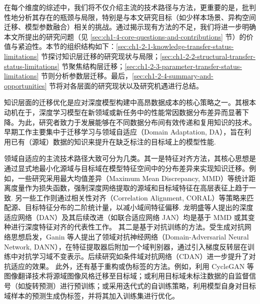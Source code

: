 \documentclass[../main.tex]{subfiles}
\begin{document}
在每个维度的综述中，我们将不仅介绍主流的技术路径与方法，更重要的是，批判性地分析其存在的瓶颈与局限，特别是与本文研究目标（如少样本场景、异构空间迁移、模型参数融合）相关的挑战。通过揭示现有方法的不足，我们将进一步明确本文所提出的研究问题（见 \ref{sec:ch1-4-core-questions-and-contributions} 节）的价值与紧迫性。本节的组织结构如下：\ref{sec:ch1-2-1-knowledge-transfer-status-limitations} 节探讨知识层迁移的研究现状与局限；\ref{sec:ch1-2-2-structural-transfer-status-limitations} 节聚焦结构层迁移；\ref{sec:ch1-2-3-parameter-transfer-status-limitations} 节则分析参数层迁移。最后，\ref{sec:ch1-2-4-summary-and-opportunities} 节将对各层面的研究现状以及研究机遇进行总结。

\label{sec:ch1-2-1-knowledge-transfer-status-limitations}

知识层面的迁移优化是应对深度模型构建中高昂数据成本的核心策略之一。其根本动机在于，深度学习模型在新领域或新任务中的性能常因数据分布差异而显著下降。为此，研究者致力于发展能够在不同数据分布间有效传递和复用知识的技术。早期工作主要集中于迁移学习与领域自适应（Domain Adaptation, DA），旨在利用已有（源域）数据的知识来提升在缺乏标注的目标域上的模型性能\cite{surveytransferlearning_pan_2010}.

领域自适应的主流技术路径大致可分为几类。其一是特征对齐方法，其核心思想是通过显式地最小化源域与目标域在模型特征空间中的分布差异来实现知识迁移。例如，一些研究采用最大均值差异（Maximum Mean Discrepancy, MMD）等统计距离度量作为损失函数，强制深度网络提取的源域和目标域特征在高层表征上趋于一致\cite{learningtransferablefeatures_long_2015}. 另一些工作则通过相关性对齐（Correlation Alignment, CORAL）等策略来匹配源、目标特征分布的二阶统计量，以减小域间特征偏移\cite{deepcoralcorrelation_sun_2016}. 龙明盛等人提出的深度适应网络（DAN）及其后续改进（如联合适应网络 JAN）均是基于 MMD 或其变种进行深度特征对齐的代表性工作\cite{learningtransferablefeatures_long_2015,deeptransferlearning_long_2017}。
其二是基于对抗训练的方法。受生成对抗网络思想启发，Ganin 等人提出了领域对抗神经网络（Domain-Adversarial Neural Network, DANN），在特征提取器后附加一个域判别器，通过引入梯度反转层在训练中对抗学习域不变表示\cite{domainadversarialtraining_ganin_2017}。后续研究如条件域对抗网络（CDAN）进一步提升了对抗适应的效果\cite{conditionaladversarialdomain_long_2018}。
此外，还有基于重构或伪标签的方法。例如，利用 CycleGAN 等图像翻译技术将源域图像风格迁移至目标域\cite{unpairedimageimage_zhu_2017}；或利用目标域未标注数据的自监督信号（如旋转预测）进行预训练\cite{unsupervisedrepresentationlearning_gidaris_2018}；或采用迭代式的自训练策略，利用模型自身对目标域样本的预测生成伪标签，并将其加入训练集进行优化\cite{pseudolabelsimple_lee_2013}。
\end{document}
